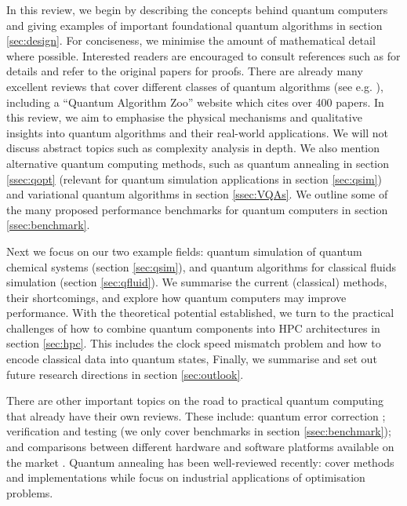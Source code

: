 \documentclass[10pt]{iopart}
\begin{document}
In this review, we begin by describing the concepts behind quantum computers and giving examples of important foundational quantum algorithms in section \ref{sec:design}. For conciseness, we minimise the amount of mathematical detail where possible. Interested readers are encouraged to consult references such as \cite{Nielsen2010,Abhijith2022} for details and refer to the original papers for proofs. There are already many excellent reviews that cover different classes of quantum algorithms (see e.g. \cite{Montanaro2016,Albash2018,Childs2010r}), including a ``Quantum Algorithm Zoo'' website \cite{QuantumAlgorithmZoo} which cites over 400 papers. In this review, we aim to emphasise the physical mechanisms and qualitative insights into quantum algorithms and their real-world applications. We will not discuss abstract topics such as complexity analysis \cite{Bernstein1993,Vazirani2002}in depth. We also mention alternative quantum computing methods, such as quantum annealing in section \ref{ssec:qopt} (relevant for quantum simulation applications in section \ref{sec:qsim}) and variational quantum algorithms in section \ref{ssec:VQAs}. We outline some of the many proposed performance benchmarks for quantum computers in section \ref{ssec:benchmark}.

Next we focus on our two example fields: quantum simulation of quantum chemical systems (section \ref{sec:qsim}), and quantum algorithms for classical fluids simulation (section \ref{sec:qfluid}). We summarise the current (classical) methods, their shortcomings, and explore how quantum computers may improve performance. With the theoretical potential established, we turn to the practical challenges of how to combine quantum components into HPC architectures in section \ref{sec:hpc}. This includes the clock speed mismatch problem and how to encode classical data into quantum states, Finally, we summarise and set out future research directions in section \ref{sec:outlook}.

There are other important topics on the road to practical quantum computing that already have their own reviews. These include: quantum error correction \cite{Terhal2015,Roffe2019}; verification and testing \cite{Eisert2020,Carrasco2021} (we only cover benchmarks in section \ref{ssec:benchmark}); and comparisons between different hardware and software platforms available on the market \cite{MacQuarrie2020}.  Quantum annealing has been well-reviewed recently: \citeauthor{Hauke2020} \cite{Hauke2020} cover methods and implementations while \citeauthor{Yarkoni2022} \cite{Yarkoni2022} focus on industrial applications of optimisation problems.
\end{document}
